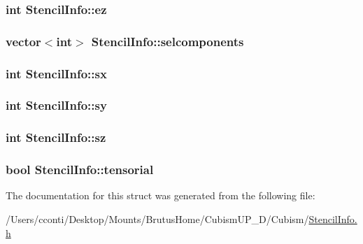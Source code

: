 \subsubsection[{ez}]{\setlength{\rightskip}{0pt plus 5cm}int Stencil\+Info\+::ez}\label{struct_stencil_info_afbdda2df54c6af8e9e8b8536e6e31bdc}
\hypertarget{struct_stencil_info_a6a07ebcb676dabaadf000e1348b8c016}{}
\subsubsection[{selcomponents}]{\setlength{\rightskip}{0pt plus 5cm}vector$<$int$>$ Stencil\+Info\+::selcomponents}\label{struct_stencil_info_a6a07ebcb676dabaadf000e1348b8c016}
\hypertarget{struct_stencil_info_acbfb2d23b2b10177dd846173a299b847}{}
\subsubsection[{sx}]{\setlength{\rightskip}{0pt plus 5cm}int Stencil\+Info\+::sx}\label{struct_stencil_info_acbfb2d23b2b10177dd846173a299b847}
\hypertarget{struct_stencil_info_a4f024cdf41fca32720321fa95bd2a8bd}{}
\subsubsection[{sy}]{\setlength{\rightskip}{0pt plus 5cm}int Stencil\+Info\+::sy}\label{struct_stencil_info_a4f024cdf41fca32720321fa95bd2a8bd}
\hypertarget{struct_stencil_info_a00e8cbf611bbb74ad861a6d74b6d0d9f}{}
\subsubsection[{sz}]{\setlength{\rightskip}{0pt plus 5cm}int Stencil\+Info\+::sz}\label{struct_stencil_info_a00e8cbf611bbb74ad861a6d74b6d0d9f}
\hypertarget{struct_stencil_info_ab3fce74853afec119eee90a6274d1559}{}
\subsubsection[{tensorial}]{\setlength{\rightskip}{0pt plus 5cm}bool Stencil\+Info\+::tensorial}\label{struct_stencil_info_ab3fce74853afec119eee90a6274d1559}


The documentation for this struct was generated from the following file\+:\begin{DoxyCompactItemize}
\item 
/\+Users/cconti/\+Desktop/\+Mounts/\+Brutus\+Home/\+Cubism\+U\+P\+\_\+D/\+Cubism/\hyperlink{_stencil_info_8h}{Stencil\+Info.\+h}\end{DoxyCompactItemize}
